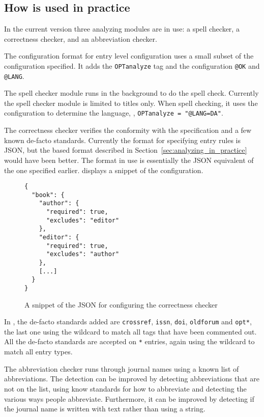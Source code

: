 \subsection{How {\orangutan} is used in practice}

In the current version three analyzing modules are in use: a spell
checker, a correctness checker, and an abbreviation checker.

The configuration format for entry level configuration uses a small
subset of the configuration specified.  It adds the
\texttt{OPTanalyze} tag and the configuration \texttt{@OK} and
\texttt{@LANG}.

The spell checker module runs  in the background to do
the spell check.  Currently the spell checker module is limited to
titles only.  When spell checking, it uses the configuration to
determine the language, \eg, \texttt{OPTanalyze = "@LANG=DA"}.

The correctness checker verifies the conformity with the {\bibtex}
specification and a few known de-facto standards.  Currently the
format for specifying entry rules is JSON, but the {\bibtex} based
format described in Section~\ref{sec:analyzing_in_practice} would have
been better.  The format in use is essentially the JSON equivalent of
the one specified earlier.  
displays a snippet of the configuration.

\begin{figure}
  \centering
\begin{verbatim}
{
  "book": {
    "author": {
      "required": true,
      "excludes": "editor"
    },
    "editor": {
      "required": true,
      "excludes": "author"
    },
    [...]
  }
}
\end{verbatim}
\caption{A snippet of the JSON for configuring the correctness checker}
\label{fig:correctness_checker_json}
\end{figure}

In {\orangutan}, the de-facto standards added are \texttt{crossref},
\texttt{issn}, \texttt{doi}, \texttt{oldforum} and \texttt{opt*}, the
last one using the wildcard to match all tags that have been commented
out.  All the de-facto standards are accepted on \texttt{*} entries,
again using the wildcard to match all entry types.

The abbreviation checker runs through journal names using a known list
of abbreviations.  The detection can be improved by detecting
abbreviations that are not on the list, using know standards for how
to abbreviate and detecting the various ways people abbreviate.
Furthermore, it can be improved by detecting if the journal name is
written with text rather than using a {\bibtex} string.


